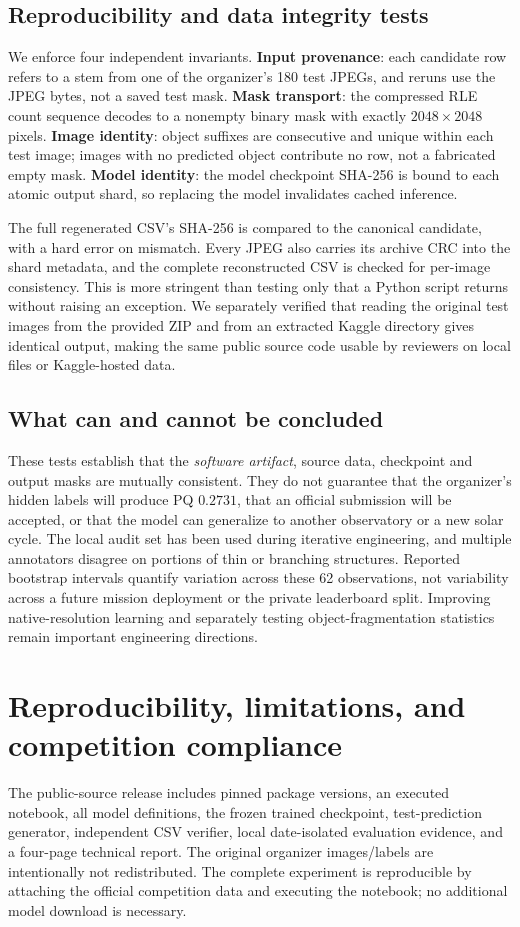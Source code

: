 \documentclass[sigconf,nonacm]{acmart}
\begin{document}
\subsection{Reproducibility and data integrity tests}
We enforce four independent invariants. \textbf{Input provenance}: each candidate row refers to a stem from one of the organizer's 180 test JPEGs, and reruns use the JPEG bytes, not a saved test mask. \textbf{Mask transport}: the compressed RLE count sequence decodes to a nonempty binary mask with exactly $2048\times2048$ pixels. \textbf{Image identity}: object suffixes are consecutive and unique within each test image; images with no predicted object contribute no row, not a fabricated empty mask. \textbf{Model identity}: the model checkpoint SHA-256 is bound to each atomic output shard, so replacing the model invalidates cached inference.

The full regenerated CSV's SHA-256 is compared to the canonical candidate, with a hard error on mismatch. Every JPEG also carries its archive CRC into the shard metadata, and the complete reconstructed CSV is checked for per-image consistency. This is more stringent than testing only that a Python script returns without raising an exception. We separately verified that reading the original test images from the provided ZIP and from an extracted Kaggle directory gives identical output, making the same public source code usable by reviewers on local files or Kaggle-hosted data.

\subsection{What can and cannot be concluded}
These tests establish that the \emph{software artifact}, source data, checkpoint and output masks are mutually consistent. They do not guarantee that the organizer's hidden labels will produce PQ $0.2731$, that an official submission will be accepted, or that the model can generalize to another observatory or a new solar cycle. The local audit set has been used during iterative engineering, and multiple annotators disagree on portions of thin or branching structures. Reported bootstrap intervals quantify variation across these 62 observations, not variability across a future mission deployment or the private leaderboard split. Improving native-resolution learning and separately testing object-fragmentation statistics remain important engineering directions.

\section{Reproducibility, limitations, and competition compliance}
The public-source release includes pinned package versions, an executed notebook, all model definitions, the frozen trained checkpoint, test-prediction generator, independent CSV verifier, local date-isolated evaluation evidence, and a four-page technical report. The original organizer images/labels are intentionally not redistributed. The complete experiment is reproducible by attaching the official competition data and executing the notebook; no additional model download is necessary.
\end{document}
